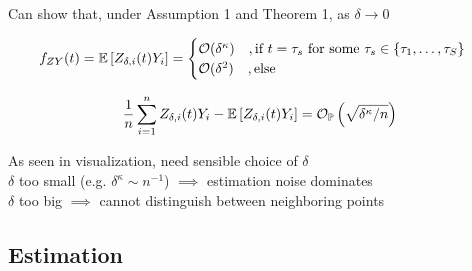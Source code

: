 \begin{frame}
    \vspace{-0.5cm}

    Can show that, under Assumption 1 and Theorem 1, as $\delta \to 0$

    \vspace{0.5cm}

    \[
        f_{ZY}(t) = \mathbb{E}\left[Z_{\delta, i}(t) Y_i\right] = 
        \begin{cases}
            \mathcal{O}(\delta^\kappa) \quad, \text{if } t = \tau_s
            \text{ for some } \tau_s \in \{\tau_1, \dots, \tau_S\}\\
            \mathcal{O}(\delta^2) \quad, \text{else}
        \end{cases}
    \]

    \vspace{0.5cm}

    \[
    \frac{1}{n} \sum_{i = 1}^n Z_{\delta, i}(t) Y_i - \mathbb{E}\left[Z_{\delta, i}(t) Y_i\right]
    = \mathcal{O}_{\mathbb{P}} \left( \sqrt{\delta^{\kappa} / n} \right)
    \]

    \vspace{0.5cm}

    As seen in visualization, need sensible choice of $\delta$\\[1em]
     $\delta$ too small (e.g. $\delta^\kappa \sim n^{-1}$) $\implies$
        estimation noise dominates\\
     $\delta$ too big $\implies$ cannot distinguish between neighboring points


\end{frame}


\subsection{Estimation}

